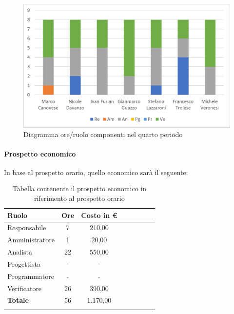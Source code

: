 \begin{figure}[H]
	\centering
	\includegraphics[width=0.8\linewidth]{res/images/preventivo/dettaglio_analisi/4-1.png}
	\caption{Diagramma ore/ruolo componenti nel quarto periodo}
	\label{fig:diagramma suddivisione ruoli quarto periodo analisi}
\end{figure}

\paragraph{Prospetto economico}
In base al prospetto orario, quello economico sarà il seguente:

\begin{longtable}{|l|c|c|c|c|c|c|c|}
	\hline
	\rowcolor{lighter-grayer}
	\textbf{Ruolo}  & \textbf{Ore} & \textbf{Costo in €} \\
	\hline
	\endfirsthead

	\hline
	Responsabile    & 7            & 210,00              \\
	\hline
	\hline
	Amministratore  & 1            & 20,00               \\
	\hline
	\hline
	Analista        & 22           & 550,00              \\
	\hline
	\hline
	Progettista     & -            & -                   \\
	\hline
	\hline
	Programmatore   & -            & -                   \\
	\hline
	\hline
	Verificatore    & 26           & 390,00              \\
	\hline
	\textbf{Totale} & 56           & 1.170,00            \\
	\hline
	\rowcolor{white}
	\caption{Tabella contenente il prospetto economico in riferimento al prospetto orario}
\end{longtable}
\pagebreak

